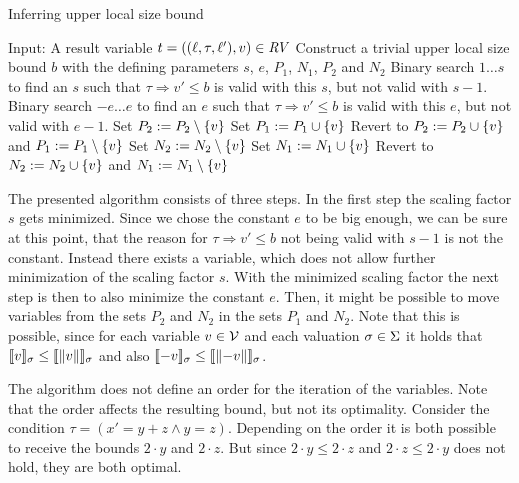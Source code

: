 \begin{algorithm}
\caption{Inferring upper local size bound}\label{lsb_algorithm}
\begin{algorithmic}[1]
  \State Input: A result variable $t = ((\ell,\tau,\ell'),v) \in \mathit{RV}$
  \State Construct a trivial upper local size bound $b$ with the defining parameters $s$, $e$, $P_1$, $N_1$, $P_2$ and $N_2$
  \State Binary search $1 \dots s$ to find an $s$ such that $\tau \Rightarrow v' \leq b$ is valid with this $s$, but not valid with $s-1$.
  \State Binary search $-e \dots e$ to find an $e$ such that $\tau \Rightarrow v' \leq b$ is valid with this $e$, but not valid with $e-1$.
    \State Set $P_2 := P_2 \setminus \lbrace v \rbrace$
      \State Set $P_1 := P_1 \cup \lbrace v \rbrace$
        \State Revert to $P_2 := P_2 \cup \lbrace v \rbrace$ and $P_1 := P_1 \setminus \lbrace v \rbrace$
      \EndIf
    \EndIf
    \State Set $N_2 := N_2 \setminus \lbrace v \rbrace$
      \State Set $N_1 := N_1 \cup \lbrace v \rbrace$
        \State Revert to $N_2 := N_2 \cup \lbrace v \rbrace$ and $N_1 := N_1 \setminus \lbrace v \rbrace$
      \EndIf
    \EndIf
  \EndFor
\end{algorithmic}
\end{algorithm}

The presented algorithm consists of three steps.
In the first step the scaling factor $s$ gets minimized.
Since we chose the constant $e$ to be big enough, we can be sure at this point, that the reason for $\tau \Rightarrow v' \leq b$ not being valid with $s-1$ is not the constant.
Instead there exists a variable, which does not allow further minimization of the scaling factor $s$.
With the minimized scaling factor the next step is then to also minimize the constant $e$.
Then, it might be possible to move variables from the sets $P_2$ and $N_2$ in the sets $P_1$ and $N_2$.
Note that this is possible, since for each variable $v \in \mathcal{V}$ and each valuation $\sigma \in \Sigma$ it holds that $\llbracket v \rrbracket_{\sigma} \leq \llbracket \left\Vert v\right\Vert \rrbracket_{\sigma}$ and also $\llbracket -v \rrbracket_{\sigma} \leq \llbracket \left\Vert-v\right\Vert \rrbracket_{\sigma}$.

The algorithm does not define an order for the iteration of the variables.
Note that the order affects the resulting bound, but not its optimality.
Consider the condition $\tau = (x' = y + z \wedge y = z)$.
Depending on the order it is both possible to receive the bounds $2 \cdot y$ and $2 \cdot z$.
But since $2 \cdot y \leq 2 \cdot z$ and $2 \cdot z \leq 2 \cdot y$ does not hold, they are both optimal.



